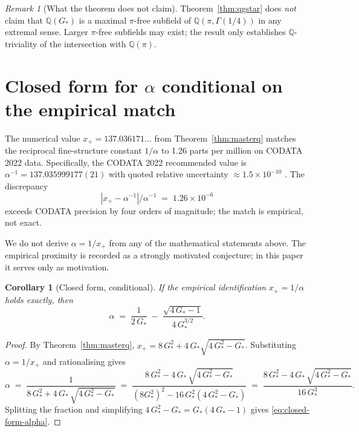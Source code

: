 \documentclass[11pt,reqno]{amsart}
\theoremstyle{plain}
\newtheorem{corollary}[theorem]{Corollary}
\theoremstyle{definition}
\theoremstyle{remark}
\newtheorem{remark}[theorem]{Remark}
\numberwithin{equation}{section}
\newcommand{\Gstar}{G_{\!*}}
\begin{document}
\begin{remark}[What the theorem does not claim]
Theorem~\ref{thm:qgstar} does \emph{not} claim that
$\mathbb{Q}(\Gstar)$ is a maximal $\pi$-free subfield of
$\mathbb{Q}(\pi, \Gamma(1/4))$ in any extremal sense. Larger
$\pi$-free subfields may exist; the result only establishes
$\mathbb{Q}$-triviality of the intersection with $\mathbb{Q}(\pi)$.
\end{remark}

\section{Closed form for $\alpha$ conditional on the empirical match}
\label{sec:closed-form}

The numerical value $x_{+} = 137.036171\ldots$ from
Theorem~\ref{thm:masterq} matches the reciprocal fine-structure
constant $1/\alpha$ to 1.26 parts per million on CODATA 2022 data.
Specifically, the CODATA 2022 recommended value is
$\alpha^{-1} = 137.035999177(21)$ with quoted relative uncertainty
$\approx 1.5 \times 10^{-10}$ \cite{codata2022}. The discrepancy
\[
  |x_{+} - \alpha^{-1}| / \alpha^{-1} \;=\; 1.26 \times 10^{-6}
\]
exceeds CODATA precision by four orders of magnitude; the match is
empirical, not exact.

We do not derive $\alpha = 1/x_{+}$ from any of the mathematical
statements above. The empirical proximity is recorded as a strongly
motivated conjecture; in this paper it serves only as motivation.

\begin{corollary}[Closed form, conditional]
\label{cor:closed-form}
If the empirical identification $x_{+} = 1/\alpha$ holds exactly,
then
\begin{equation}
\label{eq:closed-form-alpha}
  \alpha \;=\; \frac{1}{2\,\Gstar} \;-\; \frac{\sqrt{4\,\Gstar - 1}}{4\,\Gstar^{3/2}}.
\end{equation}
\end{corollary}

\begin{proof}
By Theorem~\ref{thm:masterq}, $x_{+} = 8\,\Gstar^{2} +
4\,\Gstar\sqrt{4\,\Gstar^{2} - \Gstar}$. Substituting
$\alpha = 1/x_{+}$ and rationalising gives
\[
  \alpha \;=\; \frac{1}{8\,\Gstar^{2} + 4\,\Gstar\,\sqrt{4\,\Gstar^{2} - \Gstar}}
        \;=\; \frac{8\,\Gstar^{2} - 4\,\Gstar\,\sqrt{4\,\Gstar^{2} - \Gstar}}
                   {(8\Gstar^{2})^{2} - 16\,\Gstar^{2}(4\,\Gstar^{2} - \Gstar)}
        \;=\; \frac{8\,\Gstar^{2} - 4\,\Gstar\,\sqrt{4\,\Gstar^{2} - \Gstar}}
                   {16\,\Gstar^{3}}.
\]
Splitting the fraction and simplifying $4\,\Gstar^{2} - \Gstar
= \Gstar(4\,\Gstar - 1)$ gives \eqref{eq:closed-form-alpha}.
\end{proof}
\end{document}
